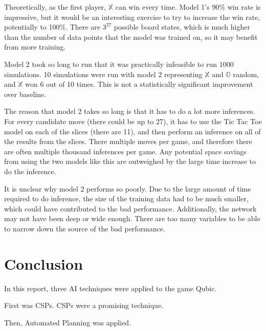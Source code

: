 \documentclass[11pt]{article}
\newcommand{\XX}{$\mathbb{X}$ }
\newcommand{\OO}{$\mathbb{O}$ }
\begin{document}
Theoretically, as the first player, \XX can win every time. Model 1's 90\% win rate is impressive, but it would be an interesting exercise to try to increase the win rate, potentially to 100\%. There are $3^{27}$ possible board states, which is much higher than the number of data points that the model was trained on, so it may benefit from more training.

Model 2 took so long to run that it was practically infeasible to run 1000 simulations. 10 simulations were run with model 2 representing \XX and \OO random, and \XX won 6 out of 10 times. This is not a statistically significant improvement over baseline.

The reason that model 2 takes so long is that it has to do a lot more inferences. For every candidate move (there could be up to 27), it has to use the Tic Tac Toe model on each of the slices (there are 11), and then perform an inference on all of the results from the slices. There multiple moves per game, and therefore there are often multiple thousand inferences per game. Any potential space savings from using the two models like this are outweighed by the large time increase to do the inference.

It is unclear why model 2 performs so poorly. Due to the large amount of time required to do inference, the size of the training data had to be much smaller, which could have contributed to the bad performance. Additionally, the network may not have been deep or wide enough. There are too many variables to be able to narrow down the source of the bad performance.

\section{Conclusion}
In this report, three AI techniques were applied to the game Qubic. 

First was CSPs. CSPs were a promising technique.

Then, Automated Planning was applied.
\end{document}
